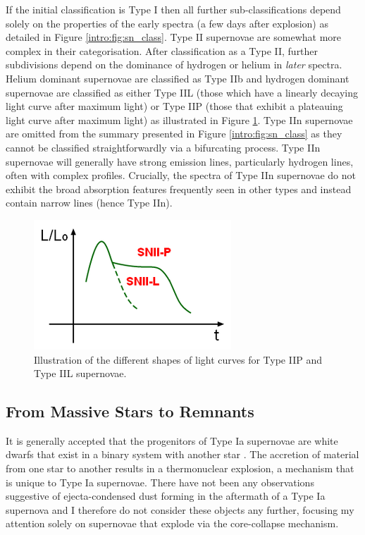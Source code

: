 If the initial classification is Type I then all further sub-classifications depend solely on the properties of the early spectra (a few days after explosion) as detailed in Figure \ref{intro:fig:sn_class}.  Type II supernovae are somewhat more complex in their categorisation.  After classification as a Type II, further subdivisions depend on the dominance of hydrogen or helium in \textit{later} spectra.  Helium dominant supernovae are classified as Type IIb and hydrogen dominant supernovae are classified as either Type IIL (those which have a linearly decaying light curve after maximum light) or Type IIP (those that exhibit a plateauing light curve after maximum light) as illustrated in Figure \ref{fig:light_curves}.  Type IIn supernovae are omitted from the summary presented in Figure \ref{intro:fig:sn_class} as they cannot be classified straightforwardly via a bifurcating process.  Type IIn supernovae will generally have strong emission lines, particularly hydrogen lines, often with complex profiles.  Crucially, the spectra of Type IIn supernovae do not exhibit the broad absorption features frequently seen in other types and instead contain narrow lines (hence Type IIn).  

\begin{figure}
\centering
\includegraphics[clip=true, scale = 1, trim=0 0 0 0]{chapters/chapter1/figs/light_curves.png}
\caption{Illustration of the different shapes of light curves for Type IIP and Type IIL supernovae.}
\label{fig:light_curves}
\end{figure}

\subsection{From Massive Stars to Remnants}

It is generally accepted that the progenitors of Type Ia supernovae are white dwarfs that exist in a binary system with another star \citep{Wang2012}.  The accretion of material from one star to another results in a thermonuclear explosion, a mechanism that is unique to Type Ia supernovae.  There have not been any observations suggestive of ejecta-condensed dust forming in the aftermath of a Type Ia supernova and I therefore do not consider these objects any further, focusing my attention solely on supernovae that explode via the core-collapse mechanism.  

